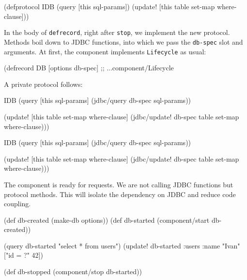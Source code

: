 \else

\begin{english}
  \begin{clojure}
(defprotocol IDB
  (query [this sql-params])
  (update! [this table set-map where-clause]))
  \end{clojure}
\end{english}

\fi

In the body of \verb|defrecord|, right after \verb|stop|, we implement the new protocol. Methods boil down to JDBC functions, into which we pass the \verb|db-spec| slot and arguments. At first, the component implements \verb|Lifecycle| as usual:

\begin{english}
  \begin{clojure}
(defrecord DB [options db-spec]
  ;; ...component/Lifecycle
  \end{clojure}
\end{english}

\noindent
A private protocol follows:

\ifnarrow

\begin{english}
  \begin{clojure}
  IDB
  (query [this sql-params]
    (jdbc/query db-spec sql-params))

  (update!
    [this table set-map where-clause]
    (jdbc/update! db-spec
      table set-map where-clause)))
  \end{clojure}
\end{english}

\else

\begin{english}
  \begin{clojure}
  IDB
  (query [this sql-params]
    (jdbc/query db-spec sql-params))

  (update! [this table set-map where-clause]
    (jdbc/update! db-spec table set-map where-clause)))
  \end{clojure}
\end{english}

\fi

The component is ready for requests. We are not calling JDBC functions but protocol methods. This will isolate the dependency on JDBC and reduce code coupling.

\ifnarrow

\begin{english}
  \begin{clojure}
(def db-created (make-db options))
(def db-started
  (component/start db-created))

(query db-started "select * from users")
(update! db-started
  :users {:name "Ivan"} ["id = ?" 42])

(def db-stopped
  (component/stop db-started))
  \end{clojure}
\end{english}

